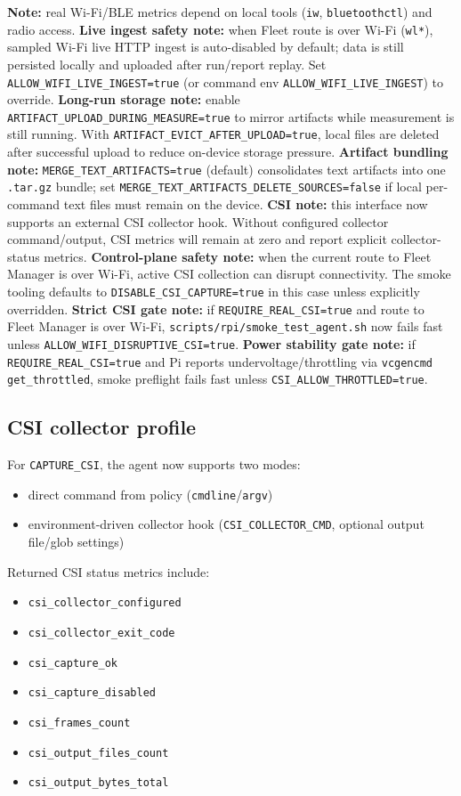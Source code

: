 \documentclass[11pt,a4paper]{article}
\begin{document}
\textbf{Note:} real Wi-Fi/BLE metrics depend on local tools (\texttt{iw}, \texttt{bluetoothctl}) and radio access.
\textbf{Live ingest safety note:} when Fleet route is over Wi-Fi (\texttt{wl*}), sampled Wi-Fi live HTTP ingest is auto-disabled by default; data is still persisted locally and uploaded after run/report replay. Set \texttt{ALLOW\_WIFI\_LIVE\_INGEST=true} (or command env \texttt{ALLOW\_WIFI\_LIVE\_INGEST}) to override.
\textbf{Long-run storage note:} enable \texttt{ARTIFACT\_UPLOAD\_DURING\_MEASURE=true} to mirror artifacts while measurement is still running. With \texttt{ARTIFACT\_EVICT\_AFTER\_UPLOAD=true}, local files are deleted after successful upload to reduce on-device storage pressure.
\textbf{Artifact bundling note:} \texttt{MERGE\_TEXT\_ARTIFACTS=true} (default) consolidates text artifacts into one \texttt{.tar.gz} bundle; set \texttt{MERGE\_TEXT\_ARTIFACTS\_DELETE\_SOURCES=false} if local per-command text files must remain on the device.
\textbf{CSI note:} this interface now supports an external CSI collector hook. Without configured collector command/output, CSI metrics will remain at zero and report explicit collector-status metrics.
\textbf{Control-plane safety note:} when the current route to Fleet Manager is over Wi-Fi, active CSI collection can disrupt connectivity. The smoke tooling defaults to \texttt{DISABLE\_CSI\_CAPTURE=true} in this case unless explicitly overridden.
\textbf{Strict CSI gate note:} if \texttt{REQUIRE\_REAL\_CSI=true} and route to Fleet Manager is over Wi-Fi, \texttt{scripts/rpi/smoke\_test\_agent.sh} now fails fast unless \texttt{ALLOW\_WIFI\_DISRUPTIVE\_CSI=true}.
\textbf{Power stability gate note:} if \texttt{REQUIRE\_REAL\_CSI=true} and Pi reports undervoltage/throttling via \texttt{vcgencmd get\_throttled}, smoke preflight fails fast unless \texttt{CSI\_ALLOW\_THROTTLED=true}.

\subsection{CSI collector profile}
For \texttt{CAPTURE\_CSI}, the agent now supports two modes:
\begin{itemize}
  \item direct command from policy (\texttt{cmdline}/\texttt{argv})
  \item environment-driven collector hook (\texttt{CSI\_COLLECTOR\_CMD}, optional output file/glob settings)
\end{itemize}

Returned CSI status metrics include:
\begin{itemize}
  \item \texttt{csi\_collector\_configured}
  \item \texttt{csi\_collector\_exit\_code}
  \item \texttt{csi\_capture\_ok}
  \item \texttt{csi\_capture\_disabled}
  \item \texttt{csi\_frames\_count}
  \item \texttt{csi\_output\_files\_count}
  \item \texttt{csi\_output\_bytes\_total}
\end{itemize}
\end{document}
